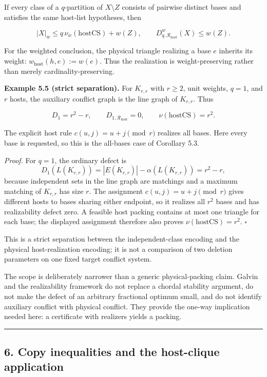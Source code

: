 \documentclass[english,11pt,a4paper]{article}
\begin{document}
If every class of a \(q\)-partition of \(X\setminus Z\) consists of
pairwise distinct bases and satisfies the same host-list hypotheses,
then

\[
|X|_w\le q\,\nu_w(\mathrm{hostCS})+w(Z),
\qquad
D_{q,\mathcal R_{\mathrm{host}}}^w(X)\le w(Z).
\]

For the weighted conclusion, the physical triangle realizing a base
\(e\) inherits its weight: \(w_{\mathrm{host}}(h,e):=w(e)\). Thus the
realization is weight-preserving rather than merely
cardinality-preserving.

\textbf{Example 5.5 (strict separation).} For \(K_{r,r}\) with
\(r\ge2\), unit weights, \(q=1\), and \(r\) hosts, the auxiliary
conflict graph is the line graph of \(K_{r,r}\). Thus

\[
D_1=r^2-r,
\qquad
D_{1,\mathcal R_{\mathrm{host}}}=0,
\qquad
\nu(\mathrm{hostCS})=r^2.
\]

The explicit host rule \(c(u,j)=u+j\pmod r\) realizes all bases. Here
every base is requested, so this is the all-bases case of Corollary 5.3.

\emph{Proof.} For \(q=1\), the ordinary defect is \[
D_1(L(K_{r,r}))=|E(K_{r,r})|-\alpha(L(K_{r,r}))=r^2-r,
\] because independent sets in the line graph are matchings and a
maximum matching of \(K_{r,r}\) has size \(r\). The assignment
\(c(u,j)=u+j\pmod r\) gives different hosts to bases sharing either
endpoint, so it realizes all \(r^2\) bases and has realizability defect
zero. A feasible host packing contains at most one triangle for each
base; the displayed assignment therefore also proves
\(\nu(\mathrm{hostCS})=r^2\). \(\square\)

This is a strict separation between the independent-class encoding and
the physical host-realization encoding; it is not a comparison of two
deletion parameters on one fixed target conflict system.

The scope is deliberately narrower than a generic physical-packing
claim. Galvin and the realizability framework do not replace a chordal
stability argument, do not make the defect of an arbitrary fractional
optimum small, and do not identify auxiliary conflict with physical
conflict. They provide the one-way implication needed here: a
certificate with realizers yields a packing.

\begin{center}\rule{0.5\linewidth}{0.5pt}\end{center}

\subsection{6. Copy inequalities and the host-clique
application}\label{copy-inequalities-and-the-host-clique-application}
\end{document}
